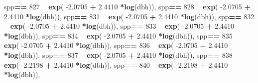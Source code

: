\documentclass[
]{article}
\newenvironment{Shaded}{\begin{snugshade}}{\end{snugshade}}
\newcommand{\DecValTok}[1]{\textcolor[rgb]{0.00,0.00,0.81}{#1}}
\newcommand{\FloatTok}[1]{\textcolor[rgb]{0.00,0.00,0.81}{#1}}
\newcommand{\KeywordTok}[1]{\textcolor[rgb]{0.13,0.29,0.53}{\textbf{#1}}}
\newcommand{\NormalTok}[1]{#1}
\newcommand{\OperatorTok}[1]{\textcolor[rgb]{0.81,0.36,0.00}{\textbf{#1}}}
\newcommand{\StringTok}[1]{\textcolor[rgb]{0.31,0.60,0.02}{#1}}
\begin{document}
\begin{Shaded}
\begin{Highlighting}[]
\NormalTok{    spp}\OperatorTok{==}\StringTok{ }\DecValTok{827} \OperatorTok{~}\StringTok{ }\KeywordTok{exp}\NormalTok{( }\FloatTok{-2.0705}   \OperatorTok{+}\StringTok{    }\FloatTok{2.4410} \OperatorTok{*}\KeywordTok{log}\NormalTok{(dbh)),}
\NormalTok{    spp}\OperatorTok{==}\StringTok{ }\DecValTok{828} \OperatorTok{~}\StringTok{ }\KeywordTok{exp}\NormalTok{( }\FloatTok{-2.0705}   \OperatorTok{+}\StringTok{    }\FloatTok{2.4410} \OperatorTok{*}\KeywordTok{log}\NormalTok{(dbh)),}
\NormalTok{    spp}\OperatorTok{==}\StringTok{ }\DecValTok{831} \OperatorTok{~}\StringTok{ }\KeywordTok{exp}\NormalTok{( }\FloatTok{-2.0705}   \OperatorTok{+}\StringTok{    }\FloatTok{2.4410} \OperatorTok{*}\KeywordTok{log}\NormalTok{(dbh)),}
\NormalTok{    spp}\OperatorTok{==}\StringTok{ }\DecValTok{832} \OperatorTok{~}\StringTok{ }\KeywordTok{exp}\NormalTok{( }\FloatTok{-2.0705}   \OperatorTok{+}\StringTok{    }\FloatTok{2.4410} \OperatorTok{*}\KeywordTok{log}\NormalTok{(dbh)),}
\NormalTok{    spp}\OperatorTok{==}\StringTok{ }\DecValTok{833} \OperatorTok{~}\StringTok{ }\KeywordTok{exp}\NormalTok{( }\FloatTok{-2.0705}   \OperatorTok{+}\StringTok{    }\FloatTok{2.4410} \OperatorTok{*}\KeywordTok{log}\NormalTok{(dbh)),}
\NormalTok{    spp}\OperatorTok{==}\StringTok{ }\DecValTok{834} \OperatorTok{~}\StringTok{ }\KeywordTok{exp}\NormalTok{( }\FloatTok{-2.0705}   \OperatorTok{+}\StringTok{    }\FloatTok{2.4410} \OperatorTok{*}\KeywordTok{log}\NormalTok{(dbh)),}
\NormalTok{    spp}\OperatorTok{==}\StringTok{ }\DecValTok{835} \OperatorTok{~}\StringTok{ }\KeywordTok{exp}\NormalTok{( }\FloatTok{-2.0705}   \OperatorTok{+}\StringTok{    }\FloatTok{2.4410} \OperatorTok{*}\KeywordTok{log}\NormalTok{(dbh)),}
\NormalTok{    spp}\OperatorTok{==}\StringTok{ }\DecValTok{836} \OperatorTok{~}\StringTok{ }\KeywordTok{exp}\NormalTok{( }\FloatTok{-2.0705}   \OperatorTok{+}\StringTok{    }\FloatTok{2.4410} \OperatorTok{*}\KeywordTok{log}\NormalTok{(dbh)),}
\NormalTok{    spp}\OperatorTok{==}\StringTok{ }\DecValTok{837} \OperatorTok{~}\StringTok{ }\KeywordTok{exp}\NormalTok{( }\FloatTok{-2.0705}   \OperatorTok{+}\StringTok{    }\FloatTok{2.4410} \OperatorTok{*}\KeywordTok{log}\NormalTok{(dbh)),}
\NormalTok{    spp}\OperatorTok{==}\StringTok{ }\DecValTok{838} \OperatorTok{~}\StringTok{ }\KeywordTok{exp}\NormalTok{( }\FloatTok{-2.2198}   \OperatorTok{+}\StringTok{    }\FloatTok{2.4410} \OperatorTok{*}\KeywordTok{log}\NormalTok{(dbh)),}
\NormalTok{    spp}\OperatorTok{==}\StringTok{ }\DecValTok{840} \OperatorTok{~}\StringTok{ }\KeywordTok{exp}\NormalTok{( }\FloatTok{-2.2198}   \OperatorTok{+}\StringTok{    }\FloatTok{2.4410} \OperatorTok{*}\KeywordTok{log}\NormalTok{(dbh)),}

\end{Highlighting}
\end{Shaded}
\end{document}
